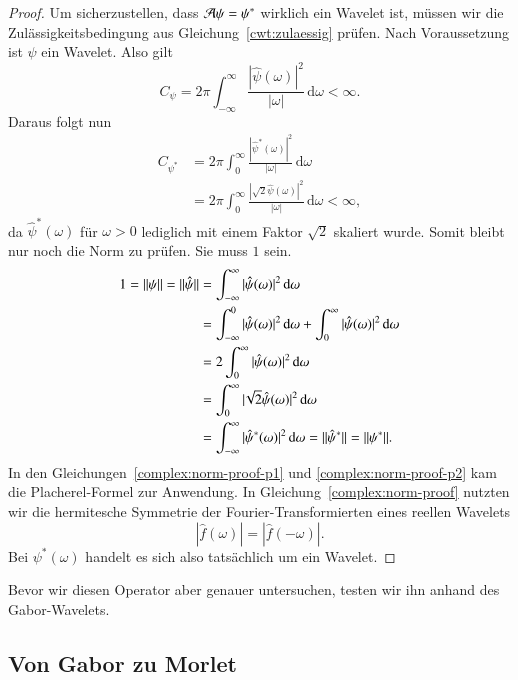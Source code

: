 \begin{proof}
	Um sicherzustellen, dass $\Ana\psi = \psi^\ast$ wirklich ein Wavelet ist, müssen wir die Zulässigkeitsbedingung aus Gleichung~\eqref{cwt:zulaessig} prüfen.
	Nach Voraussetzung ist $\psi$ ein Wavelet.
	Also gilt
	\[
	C_{\psi}
	=
	2\pi
	\int_{-\infty}^\infty \frac{|\hat{\psi}(\omega)|^2}{|\omega|}\,\mathrm{d}\omega < \infty.
	\]
	Daraus folgt nun
	\begin{align}
	C_{\psi^\ast}
	&= 2\pi	\int_{0}^\infty \frac{|\hat{\psi}^\ast(\omega)|^2}{|\omega|}\,\mathrm{d}\omega \\
	&= 2\pi \int_{0}^\infty \frac{|\!\sqrt{2}\hat{\psi}(\omega)|^2}{|\omega|}\,\mathrm{d}\omega 
	< \infty,
	\end{align}
	da $\hat\psi^\ast(\omega)$ für $\omega > 0$ lediglich mit einem Faktor $\sqrt 2$ skaliert wurde.
	Somit bleibt nur noch die Norm zu prüfen.
	Sie muss $1$ sein.
	\begin{align}
	1 = \|\psi\| = \|\hat{\psi}\| 
	&= \int_{-\infty}^{\infty}|\hat{\psi}(\omega)|^2 \,\mathrm{d}\omega \label{complex:norm-proof-p1}\\
	&= \int_{-\infty}^{0}|\hat{\psi}(\omega)|^2 \,\mathrm{d}\omega +  \int_{0}^{\infty}|\hat{\psi}(\omega)|^2 \,\mathrm{d}\omega \notag\\
	&=  2\int_{0}^{\infty} |\hat{\psi}(\omega)|^2 \,\mathrm{d}\omega \label{complex:norm-proof}\\
	&=  \int_{0}^{\infty}|\!\sqrt{2}\hat{\psi}(\omega)|^2 \,\mathrm{d}\omega \notag\\
	&=  \int_{-\infty}^{\infty}|\hat{\psi}^\ast(\omega)|^2 \,\mathrm{d}\omega 
	= \|\hat{\psi}^\ast\| = \|\psi^\ast\|.\label{complex:norm-proof-p2}
	\end{align}
	In den Gleichungen~\eqref{complex:norm-proof-p1} und \eqref{complex:norm-proof-p2} kam die Placherel-Formel zur Anwendung.
	In Gleichung~\eqref{complex:norm-proof} nutzten wir die hermitesche Symmetrie der Fourier-Transformierten eines reellen Wavelets
	\[|\hat{f}(\omega)| = |\hat{f}(-\omega)|.\]
	Bei $\psi^\ast(\omega)$ handelt es sich also tatsächlich um ein Wavelet.
\end{proof}

Bevor wir diesen Operator aber genauer untersuchen, testen wir ihn anhand des Gabor-Wavelets.

\subsection{Von Gabor zu Morlet}
\label{complex:gabor-to-morlet}

